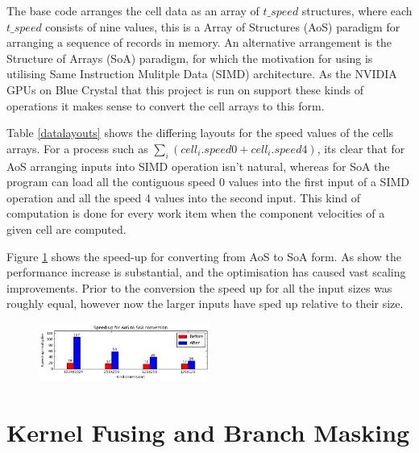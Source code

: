 \documentclass[12pt, a4paper]{article}
\begin{document}
  \begin{multicols}{2}

    The base code arranges the cell data as an array of $t\_speed$ structures, where each $t\_speed$ consists of nine values, this is a Array of Structures (AoS) paradigm for arranging a sequence of records in memory. An alternative arrangement is the Structure of Arrays (SoA) paradigm, for which the motivation for using is utilising Same Instruction Mulitple Data (SIMD) architecture. As the NVIDIA GPUs on Blue Crystal that this project is run on support these kinds of operations it makes sense to convert the cell arrays to this form.

    Table \ref{datalayouts} shows the differing layouts for the speed values of the cells arrays. For a process such as $\sum_i (cell_i.speed0 + cell_i.speed4)$, its clear that for AoS arranging inputs into SIMD operation isn't natural, whereas for SoA the program can load all the contiguous speed 0 values into the first input of a SIMD operation and all the speed 4 values into the second input. This kind of computation is done for every work item when the component velocities of a given cell are computed.

    Figure \ref{aos2soa} shows the speed-up for converting from AoS to SoA form. As show the performance increase is substantial, and the optimisation has caused vast scaling improvements. Prior to the conversion the speed up for all the input sizes was roughly equal, however now the larger inputs have sped up relative to their size.

    \begin{figure}[H]
      \caption{} \label{aos2soa}
      \vspace{-0.8cm}
      \begin{center}
        \includegraphics[width=0.5\textwidth]{figures/aos2soa}
      \end{center}
    \end{figure}

  \end{multicols}

  \section*{Kernel Fusing and Branch Masking}
\end{document}

